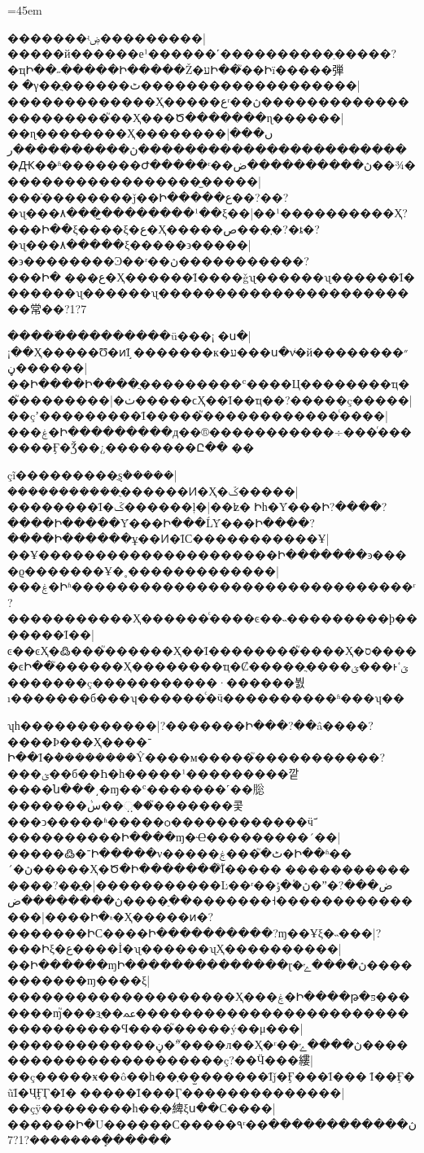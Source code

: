 \documentclass[12pt]{article}
\begin{document}
\vfil
\newfontfamily{}
\newfontfamily{}
\setgezhuraise{-5pt}
\everygezhu{\fontsize{4}{5}\selectfont}
\gezhuraggedtrue
\gezhunormalizetrue
\hsize=45em
\begin{withgezhu}

�������ʵۻ���������|{�����й������е¹������˹����������ַ�����?�ҵԻ��˶�����Ի�����Ž�עԻ��֮��Իï�����弾�ֵ�֮�γ��ֲ������ٹ���������}����������|{�������������Ҳ�����عʳ��ڽ���������������}�������֮��Ҳ���Ծ�������ɳ������|{��ɳ����̶����Ҳ}��������ں���|{�����������������������ڽ����������ر�Ԫ��ʱ�������Ժ�����ʳ��ڽ����������ض��¾�����������}��������̫����|{���ֿ��������ǰ��Ի�����ع��?��?�ʯ���۸���̫��}������¹��ξ��|{��¹����������Ҳ?���Ի��ξ����ξ�ع�Ҳ�����ص���ְ�?�ȶ�?�ʯ���۸�����ξ}�����϶�����|{�϶��������Ͽ��ʳ��ڽ�����������?���Ի����ع�Ҳ������Ϊ����ǧʯ������ʯ������Ϊ�������ʯ������ʯ}������������������������常��?1?7

�����߳���������ü���¡׼�ս�|{¡��Ҳ�����Ʊ�ͷΪ׼֣�������к�ע���ս�νͥ�й���״����}�����ڼ��|{��Ի����Ի�}���ֲ���������ʿ����Ц��������ҵ��֮��������|{�ٺ�����ϲҲ��Ϊ��ҵ��?���}��ç�����|{��çʼ���������Ϊ���}��֮������������ͨ����|{���ۼ�Ի���������д��®�����������÷���ͬ�������Ӻ�Ǯ��¿��������Ը����}

çĩ���������ֻȿܵ�����|{�����������ֻ������Ͷ�Ҳ}�ػ�����|{��������Ϊ�ػ�}�����ļ�|{��ʫ�⴫Իһ�Ȳ���Ի?����?����Ի�����Ȳ���Ի���ĹȲ���Ի����?����Ի����}��ұ��Ͷ�ΪС�����������Ұ|{��Ұ���������������������Ի�������ͽ����ϱ�������Ұ�˳���}����������|{���ۼ�Իʱ������������������������������ʳ?�����������Ҳ}������ͨ����ͼ��˵���������ϸ�������Ϊ��|{ͼ��ͼҲ�߷���֮������Ҳ��Ϊ��������֮����Ҳ�ס�����ͼԻ��֮������Ҳ}��������ҵ�Ȼ�����ֲ����ؽ���ͱؾٴ�������ç�����������·������붨ı�������б���ʮ������ͨ�ӵ����������ʱ���ʮ��

ʮһ������������|{?�������Ի���?��â����?����Ϸ���Ҳ����־Ի��Ϊ�ܵ��������Ŷ����м�����֮�����������?���ؽ��б��Һ�һ�����¹���������깥����ն���͵�ɱ��ʿ�������˹��䶼�������ܵس��಼��֮��}�����콫���ͻ�����ʱ�����ѻ������������ӵܿ־����������Ի����ɱ�Ҽ���������´��|{�����߷�־Ի�����ν�����ٹ�֮���ۼ�Ի��ʱ��´�ڽ�����Ҳ}�Ծ�Ի�������ิΪ֮�����԰���������������?��ֱ�|{�����������Ŀ��ʳ��ڽ�۫�ݸ�ˮ�ض���?��ֵ����ڽ��������ض���}����˧���������������|{����Ի�۾�Ҳ�����ͷ�?�������ԻС����Ի��}��������?ɱ��Ұξ�˵���|{?���Իξ�ع����İ�ʯ������ʯҲ}����������|{��Ի������ɱԻ��������������ɽ�ڽ����ݺ���������}��ɱ����ξ|{��������������������Ҳ���ۼ�Ի����թ�ƽ�������ɱ֮}���зֲ��ﲻ����������������������������������Ϥ����֮�����ý��μ���|{�������������ڼ�ˮ֮����л��Ҳ�ʳ��ڽ����ݺ�������������������}����ç?��Ӵ���縷|{��ç�����ӿ��ô��һ��ְ��̫������Ϊǰ�Ӻ���Ϊ���򣴨Ϊ��Ӻ�ũΪ�ҶӺӶ�Ϊ�׶�����Ϊ���Ӷ�����}���������|{��çÿ��������һ��ְ�綼ξ}ս��С����|{������Ի�U������С�����۹ʳ��ڽ������������}������ܻ�������?1?7
\end{withgezhu}
\end{document}

